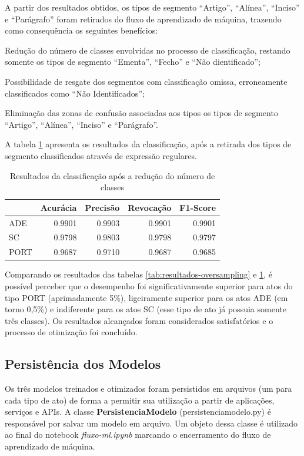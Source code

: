 A partir dos resultados obtidos, os tipos de segmento ``Artigo'', ``Alínea'', ``Inciso'' e ``Parágrafo'' foram retirados do fluxo de aprendizado de máquina, trazendo como consequência os seguintes benefícios:
\begin{alineas}
	\item Redução do número de classes envolvidas no processo de classificação, restando somente os tipos de segmento ``Ementa'', ``Fecho'' e ``Não dientificado'';
	\item Possibilidade de resgate dos segmentos com classificação omissa, erroneamente classificados como ``Não Identificados'';
	\item Eliminação das zonas de confusão associadas aos tipos os tipos de segmento ``Artigo'', ``Alínea'', ``Inciso'' e ``Parágrafo''.
\end{alineas}  

A tabela \ref{tab:resultados-apos-classificacao-regex} apresenta os resultados da classificação, após a retirada dos tipos de segmento classificados através de expressão regulares. 

\begin{table}[h]
\caption{Resultados da classificação após a redução do número de  classes}
\label{tab:resultados-apos-classificacao-regex}
	\begin{center}
	\begin{tabular}{lrrrr}
		\toprule
		{} &  Acurácia &  Precisão &  Revocação &      F1-Score \\
		\midrule
		ADE     &    0.9901 &    0.9903 &     0.9901 &  0.9901 \\
		SC      &    0.9798 &    0.9803 &     0.9798 &  0.9797 \\					PORT 	&    0.9687 &    0.9710 &     0.9687 &  0.9685 \\
		\bottomrule
	\end{tabular}
	\end{center}		
\end{table}


Comparando os resultados das tabelas \ref{tab:resultados-oversampling} e \ref{tab:resultados-apos-classificacao-regex}, é possível perceber que  o desempenho foi significativamente superior para atos do tipo PORT (aprimadamente 5\%), ligeiramente superior para os atos ADE (em torno 0,5\%) e indiferente para os atos SC (esse tipo de ato já possuia somente três classes). Os resultados alcançados foram considerados satisfatórios e o processo de otimização foi concluído.

\subsection{Persistência dos Modelos}

Os três modelos treinados e otimizados foram persistidos em arquivos (um para cada tipo de ato) de forma a permitir sua utilização a partir de aplicações, serviços e APIs. A classe \textbf{PersistenciaModelo} (persistencia\textunderscore modelo.py) é responsável por salvar um modelo em arquivo. Um objeto dessa classe é utilizado ao final do notebook \textit{fluxo-ml.ipynb} marcando o encerramento do fluxo de aprendizado de máquina. 

